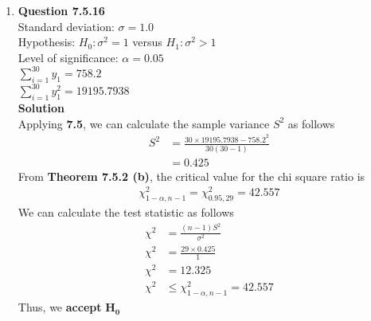 \documentclass{uofa-eng-assignment}
\begin{document}
\begin{enumerate}
    \item[]
        \textbf{Question 7.5.16} \\
        Standard deviation: $\sigma = 1.0$ \\
        Hypothesis: $H_0\!:\sigma^2 = 1$ versus $H_1\!:\sigma^2 > 1$ \\
        Level of significance: $\alpha = 0.05$ \\
        $\sum_{i=1}^{30}y_1 = 758.2$ \\
        $\sum_{i=1}^{30}y_1^2 = 19195.7938$ \\
        \textbf{Solution} \\
        Applying \textbf{7.5}, we can calculate the sample variance $S^2$ as follows
        \begin{align*}
            S^2 & = \frac{30 \times 19195.7938 - 758.2^2}{30(30-1)} \\
                & = 0.425
        \end{align*}
        From \textbf{Theorem 7.5.2 (b)}, the critical value for the chi square ratio is
        \begin{align*}
            \chi^2_{1-\alpha, n-1} = \chi^2_{0.95, 29} = 42.557
        \end{align*}
        We can calculate the test statistic as follows
        \begin{align*}
            \chi^2 & = \frac{(n-1)S^2}{\sigma^2}          \\
            \chi^2 & = \frac{29 \times 0.425}{1}          \\
            \chi^2 & = 12.325                             \\
            \chi^2 & \leq \chi^2_{1-\alpha, n-1} = 42.557
        \end{align*}
        Thus, we \textbf{accept} $\boldsymbol{H_0}$
\end{enumerate}
\end{document}
